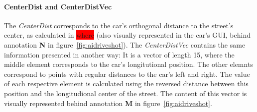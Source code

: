 \paragraph{CenterDist and CenterDistVec} The \emph{CenterDist} corresponds to the car's orthogonal distance to the street's center, as calculated in \colorbox{red}{where} (also visually represented in the car's GUI, behind annotation \textbf{N} in figure~\ref{fig:aidriveshot}).
The \emph{CenterDistVec} contains the same information presented in another way: It is a vector of length 15, where the middle element corresponds to the car's longitutional position. The other elemnts correspond to points with regular distances to the car's left and right. The value of each respective element is calculated using the reversed distance between this position and the longitudional center of the street. The content of this vector is visually represented behind annotation \textbf{M} in figure~\ref{fig:aidriveshot}.

